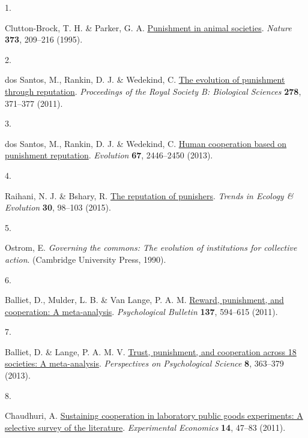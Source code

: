 \documentclass[
  man,floatsintext]{apa6}
\newlength{\cslhangindent}
\newlength{\csllabelwidth}
\newlength{\cslentryspacingunit} %
\newenvironment{CSLReferences}[2] %
 {%
  \setlength{\parindent}{0pt}
  \ifodd #1
  \let\oldpar\par
  \def\par{\hangindent=\cslhangindent\oldpar}
  \fi
  \setlength{\parskip}{#2\cslentryspacingunit}
 }%
 {}
\newcommand{\CSLLeftMargin}[1]{\parbox[t]{\csllabelwidth}{#1}}
\newcommand{\CSLRightInline}[1]{\parbox[t]{\linewidth - \csllabelwidth}{#1}\break}
\begin{document}
\hypertarget{refs}{}
\begin{CSLReferences}{0}{0}
\leavevmode{}%
\CSLLeftMargin{1. }%
\CSLRightInline{Clutton-Brock, T. H. \& Parker, G. A. \href{https://doi.org/10.1038/373209a0}{Punishment in animal societies}. \emph{Nature} \textbf{373}, 209--216 (1995).}

\leavevmode{}%
\CSLLeftMargin{2. }%
\CSLRightInline{dos Santos, M., Rankin, D. J. \& Wedekind, C. \href{https://doi.org/10.1098/rspb.2010.1275}{The evolution of punishment through reputation}. \emph{Proceedings of the Royal Society B: Biological Sciences} \textbf{278}, 371--377 (2011).}

\leavevmode{}%
\CSLLeftMargin{3. }%
\CSLRightInline{dos Santos, M., Rankin, D. J. \& Wedekind, C. \href{https://www.jstor.org/stable/24032701}{Human cooperation based on punishment reputation}. \emph{Evolution} \textbf{67}, 2446--2450 (2013).}

\leavevmode{}%
\CSLLeftMargin{4. }%
\CSLRightInline{Raihani, N. J. \& Bshary, R. \href{https://doi.org/10.1016/j.tree.2014.12.003}{The reputation of punishers}. \emph{Trends in Ecology \& Evolution} \textbf{30}, 98--103 (2015).}

\leavevmode{}%
\CSLLeftMargin{5. }%
\CSLRightInline{Ostrom, E. \emph{Governing the commons: The evolution of institutions for collective action}. (Cambridge University Press, 1990).}

\leavevmode{}%
\CSLLeftMargin{6. }%
\CSLRightInline{Balliet, D., Mulder, L. B. \& Van Lange, P. A. M. \href{https://doi.org/10.1037/a0023489}{Reward, punishment, and cooperation: A meta-analysis}. \emph{Psychological Bulletin} \textbf{137}, 594--615 (2011).}

\leavevmode{}%
\CSLLeftMargin{7. }%
\CSLRightInline{Balliet, D. \& Lange, P. A. M. V. \href{https://doi.org/10.1177/1745691613488533}{Trust, punishment, and cooperation across 18 societies: A meta-analysis}. \emph{Perspectives on Psychological Science} \textbf{8}, 363--379 (2013).}

\leavevmode{}%
\CSLLeftMargin{8. }%
\CSLRightInline{Chaudhuri, A. \href{https://doi.org/10.1007/s10683-010-9257-1}{Sustaining cooperation in laboratory public goods experiments: A selective survey of the literature}. \emph{Experimental Economics} \textbf{14}, 47--83 (2011).}


\end{CSLReferences}
\end{document}
